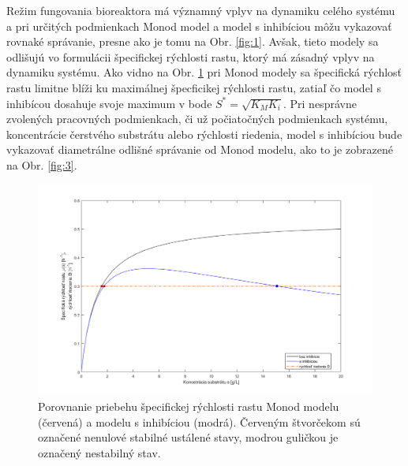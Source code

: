 Režim fungovania bioreaktora má významný vplyv na dynamiku celého systému a pri určitých podmienkach Monod model a model s inhibíciou môžu vykazovať rovnaké správanie, presne ako je tomu na Obr. \ref{fig:1}. Avšak, tieto modely sa odlišujú vo formulácii špecifickej rýchlosti rastu, ktorý má zásadný vplyv na dynamiku systému. Ako vidno na Obr. \ref{fig:2} pri Monod modely
sa špecifická rýchlosť rastu limitne blíži ku maximálnej špecficikej rýchlosti rastu, zatiaľ čo model s inhibícou dosahuje svoje maximum v bode $S^{*} = \sqrt{K_M K_i}$.
Pri nesprávne zvolených pracovných podmienkach, či už počiatočných podmienkach systému, koncentrácie čerstvého substrátu alebo rýchlosti riedenia, model s inhibíciou bude vykazovať diametrálne odlišné správanie od Monod modelu, ako to je zobrazené na Obr. \ref{fig:3}.

\begin{figure}
	\centering
	\includegraphics[width=.7\linewidth]{images/spec_grow_rate_comparison}
	\caption[]{Porovnanie priebehu špecifickej rýchlosti rastu Monod modelu (červená) a modelu s inhibíciou (modrá). Červeným štvorčekom sú označené nenulové stabilné ustálené stavy, modrou guličkou je označený nestabilný stav.}
	\label{fig:2}
\end{figure}

